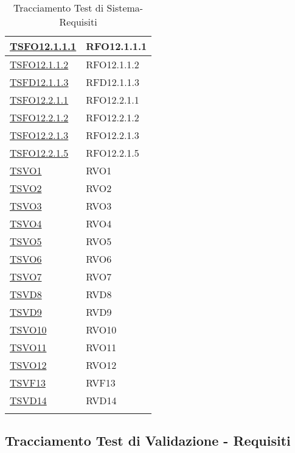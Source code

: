 \begin{longtable}{|>{\centering}m{5cm}|m{5cm}<{\centering}|}
	\hyperlink{TSFO12.1.1.1}{TSFO12.1.1.1} & RFO12.1.1.1\\ \hline
	\hyperlink{TSFO12.1.1.2}{TSFO12.1.1.2} & RFO12.1.1.2\\ \hline
	\hyperlink{TSFD12.1.1.3}{TSFD12.1.1.3} & RFD12.1.1.3\\ \hline
	\hyperlink{TSFO12.2.1.1}{TSFO12.2.1.1} & RFO12.2.1.1\\ \hline
	\hyperlink{TSFO12.2.1.2}{TSFO12.2.1.2} & RFO12.2.1.2\\ \hline
	\hyperlink{TSFO12.2.1.3}{TSFO12.2.1.3} & RFO12.2.1.3\\ \hline
	\hyperlink{TSFO12.2.1.5}{TSFO12.2.1.5} & RFO12.2.1.5\\ \hline
	\hyperlink{TSVO1}{TSVO1} & RVO1\\ \hline
	\hyperlink{TSVO2}{TSVO2} & RVO2\\ \hline
	\hyperlink{TSVO3}{TSVO3} & RVO3\\ \hline
	\hyperlink{TSVO4}{TSVO4} & RVO4\\ \hline
	\hyperlink{TSVO5}{TSVO5} & RVO5\\ \hline
	\hyperlink{TSVO6}{TSVO6} & RVO6\\ \hline
	\hyperlink{TSVO7}{TSVO7} & RVO7\\ \hline
	\hyperlink{TSVD8}{TSVD8} & RVD8\\ \hline
	\hyperlink{TSVD9}{TSVD9} & RVD9\\ \hline
	\hyperlink{TSVO10}{TSVO10} & RVO10\\ \hline
	\hyperlink{TSVO11}{TSVO11} & RVO11\\ \hline
	\hyperlink{TSVO12}{TSVO12} & RVO12\\ \hline
	\hyperlink{TSVF13}{TSVF13} & RVF13\\ \hline
	\hyperlink{TSVD14}{TSVD14} & RVD14\\ \hline	
	\caption[Tracciamento Test di Sistema-Requisiti]{Tracciamento Test di Sistema-Requisiti}
	\label{tabella:ts-requi}
\end{longtable}
\clearpage

\subsection{Tracciamento Test di Validazione - Requisiti}

